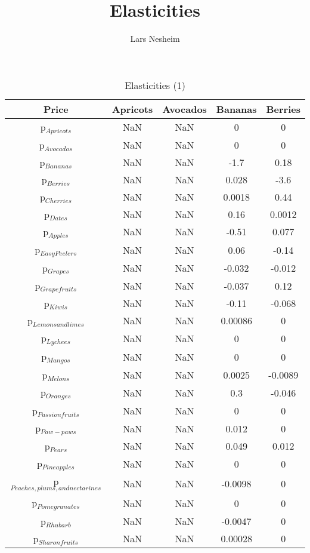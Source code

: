 \documentclass[11pt]{article}
\title{Elasticities}
\author{Lars Nesheim}
\date{}
\begin{document}
\maketitle
\begin{table}[h]
\caption{Elasticities (1)}
\label{Table: elasticities 1}
\begin{center}
\begin{tabular}{ccccc}
Price & Apricots & Avocados & Bananas & Berries \\ \hline
p$_{Apricots}$ & NaN & NaN & 0 & 0 \\ 
p$_{Avocados}$ & NaN & NaN & 0 & 0 \\ 
p$_{Bananas}$ & NaN & NaN & -1.7 & 0.18 \\ 
p$_{Berries}$ & NaN & NaN & 0.028 & -3.6 \\ 
p$_{Cherries}$ & NaN & NaN & 0.0018 & 0.44 \\ 
p$_{Dates}$ & NaN & NaN & 0.16 & 0.0012 \\ 
p$_{Apples}$ & NaN & NaN & -0.51 & 0.077 \\ 
p$_{Easy Peelers}$ & NaN & NaN & 0.06 & -0.14 \\ 
p$_{Grapes}$ & NaN & NaN & -0.032 & -0.012 \\ 
p$_{Grapefruits}$ & NaN & NaN & -0.037 & 0.12 \\ 
p$_{Kiwis}$ & NaN & NaN & -0.11 & -0.068 \\ 
p$_{Lemons and limes}$ & NaN & NaN & 0.00086 & 0 \\ 
p$_{Lychees}$ & NaN & NaN & 0 & 0 \\ 
p$_{Mangos}$ & NaN & NaN & 0 & 0 \\ 
p$_{Melons}$ & NaN & NaN & 0.0025 & -0.0089 \\ 
p$_{Oranges}$ & NaN & NaN & 0.3 & -0.046 \\ 
p$_{Passion fruits}$ & NaN & NaN & 0 & 0 \\ 
p$_{Paw-paws}$ & NaN & NaN & 0.012 & 0 \\ 
p$_{Pears}$ & NaN & NaN & 0.049 & 0.012 \\ 
p$_{Pineapples}$ & NaN & NaN & 0 & 0 \\ 
p$_{Peaches, plums, and nectarines}$ & NaN & NaN & -0.0098 & 0 \\ 
p$_{Pomegranates}$ & NaN & NaN & 0 & 0 \\ 
p$_{Rhubarb}$ & NaN & NaN & -0.0047 & 0 \\ 
p$_{Sharon fruits}$ & NaN & NaN & 0.00028 & 0 \\ 
\end{tabular}
\end{center}
\end{table}
\end{document}
